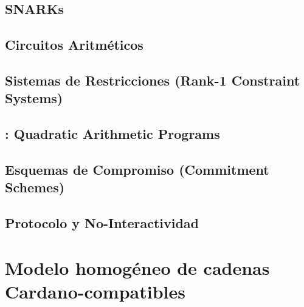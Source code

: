 \documentclass[11pt,a4paper,twoside]{tesis}
\begin{document}


\section{SNARKs}
\label{sec:aritmetizacion-y-construccion-de-un-snark-snarks}



\section{Circuitos Aritméticos}
\label{sec:aritmetizacion-y-construccion-de-un-snark-circuitos-aritmeticos}



\section{Sistemas de Restricciones \ROneCS (Rank-1 Constraint Systems)}
\label{sec:aritmetizacion-y-construccion-de-un-snark-sistemas-de-restricciones-ronecs-rank-1-constraint-systems}



\section{\QAP: Quadratic Arithmetic Programs}
\label{sec:aritmetizacion-y-construccion-de-un-snark-qap-quadratic-arithmetic-programs}



\section{Esquemas de Compromiso (Commitment Schemes)}
\label{sec:aritmetizacion-y-construccion-de-un-snark-esquemas-de-compromiso-commitment-schemes}



\section{\KZG}
\label{sec:aritmetizacion-y-construccion-de-un-snark-kzg}



\section{Protocolo \FiatShamir y No-Interactividad}
\label{sec:aritmetizacion-y-construccion-de-un-snark-protocolo-fiatshamir-y-no-interactividad}



\section{\Groth}
\label{sec:aritmetizacion-y-construccion-de-un-snark-groth}



\chapter{Modelo homogéneo de cadenas Cardano-compatibles}
\label{chap:modelo-homogeneo-cadenas-cardano-compatibles}


\end{document}
